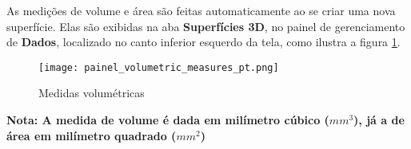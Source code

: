 As medições de volume e área são feitas automaticamente ao se criar uma nova superfície.
Elas são exibidas na aba \textbf{Superfícies 3D}, no painel de gerenciamento de \textbf{Dados}, localizado no canto
inferior esquerdo da tela, como ilustra a figura \ref{fig:volumetric_mensure}.

\begin{figure}[!htb]
\centering
\texttt{[image: painel\_volumetric\_measures\_pt.png]}
\caption{Medidas volumétricas}
\label{fig:volumetric_mensure}
\end{figure}

\textbf{Nota: A medida de volume é dada em milímetro cúbico ($mm^3$), já a de área em milímetro quadrado ($mm^2$)}
